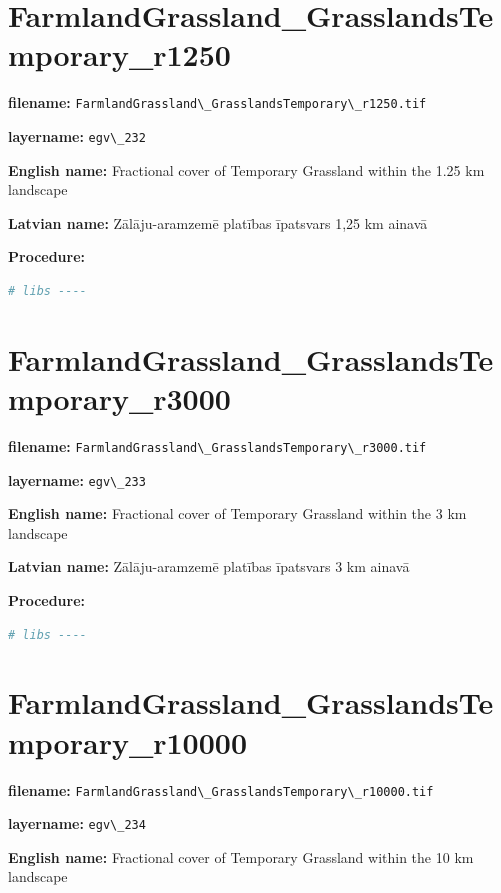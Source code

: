 \documentclass[
]{book}
\newcommand{\passthrough}[1]{#1}
\begin{document}
\section{FarmlandGrassland\_GrasslandsTemporary\_r1250}\label{ch06.232}

\textbf{filename:} \passthrough{\lstinline!FarmlandGrassland\_GrasslandsTemporary\_r1250.tif!}

\textbf{layername:} \passthrough{\lstinline!egv\_232!}

\textbf{English name:} Fractional cover of Temporary Grassland within the 1.25 km landscape

\textbf{Latvian name:} Zālāju-aramzemē platības īpatsvars 1,25 km ainavā

\textbf{Procedure:}

\begin{lstlisting}[language=R]
# libs ----
\end{lstlisting}

\section{FarmlandGrassland\_GrasslandsTemporary\_r3000}\label{ch06.233}

\textbf{filename:} \passthrough{\lstinline!FarmlandGrassland\_GrasslandsTemporary\_r3000.tif!}

\textbf{layername:} \passthrough{\lstinline!egv\_233!}

\textbf{English name:} Fractional cover of Temporary Grassland within the 3 km landscape

\textbf{Latvian name:} Zālāju-aramzemē platības īpatsvars 3 km ainavā

\textbf{Procedure:}

\begin{lstlisting}[language=R]
# libs ----
\end{lstlisting}

\section{FarmlandGrassland\_GrasslandsTemporary\_r10000}\label{ch06.234}

\textbf{filename:} \passthrough{\lstinline!FarmlandGrassland\_GrasslandsTemporary\_r10000.tif!}

\textbf{layername:} \passthrough{\lstinline!egv\_234!}

\textbf{English name:} Fractional cover of Temporary Grassland within the 10 km landscape
\end{document}
